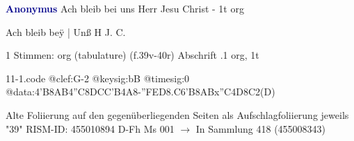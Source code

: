 \documentclass[twocolumn]{book}
\begin{document}
\newline \par \vspace{7pt} \textcolor{darkblue}{\textbf{Anonymus  }}
\newline Ach bleib bei uns Herr Jesu Christ - 1t
\newline org
\newline \begin{itshape}[f.39v, at left:] Ach bleib beÿ | Unß H J. C.\end{itshape} 
\newline \textcolor{darkblue}{}  1 Stimmen: org (tabulature)  (f.39v-40r)
\newline Abschrift
.1  org, 1t  
\begin{filecontents*}{11-1.code}
@clef:G-2
@keysig:bB
@timesig:0
@data:4'B{8AB}4''C{8DC}{C'B}4A8-{''FED}{8.C6'B8AB}x''C4D8C2(D)
\end{filecontents*}
\newline
%
\newline Alte Foliierung auf den gegenüberliegenden Seiten als Aufschlagfoliierung jeweils "39"
\newline RISM-ID: 455010894
\newline D-Fh  Ms 001
\newline $\rightarrow$ In Sammlung 418 (455008343)
      
\end{document}
